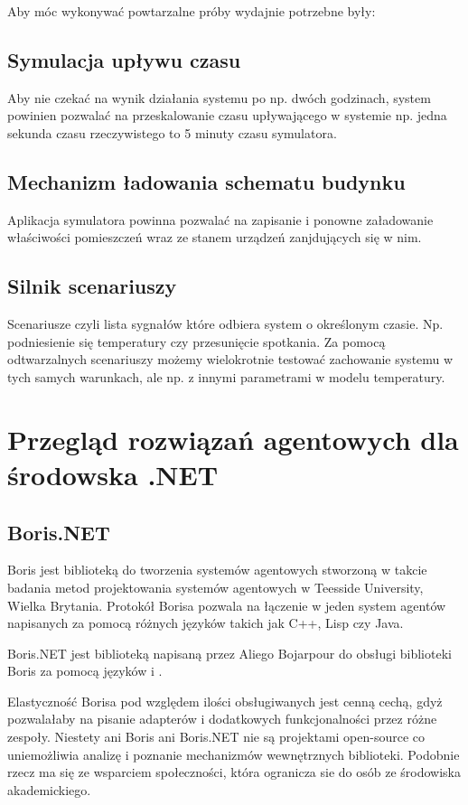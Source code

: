 Aby móc wykonywać powtarzalne próby wydajnie potrzebne były:

\subsection*{Symulacja upływu czasu}
Aby nie czekać na wynik działania systemu po np. dwóch godzinach, system powinien pozwalać na przeskalowanie czasu upływającego w systemie np. jedna sekunda czasu rzeczywistego to 5 minuty czasu symulatora.

\subsection*{Mechanizm ładowania schematu budynku}
Aplikacja symulatora powinna pozwalać na zapisanie i ponowne załadowanie właściwości pomieszczeń wraz ze stanem urządzeń zanjdujących się w nim.

\subsection*{Silnik scenariuszy}
Scenariusze czyli lista sygnałów które odbiera system o określonym czasie. Np. podniesienie się temperatury czy przesunięcie spotkania. Za pomocą odtwarzalnych scenariuszy możemy wielokrotnie testować zachowanie systemu w tych samych warunkach, ale np. z innymi parametrami w modelu temperatury.

\section{Przegląd rozwiązań agentowych dla środowska .NET}
\subsection{Boris.NET}
Boris jest biblioteką do tworzenia systemów agentowych stworzoną w takcie badania metod projektowania systemów agentowych w Teesside University, Wielka Brytania. Protokół Borisa pozwala na łączenie w jeden system agentów napisanych za pomocą różnych języków takich jak C++, Lisp czy Java. 

Boris.NET jest biblioteką napisaną przez Aliego Bojarpour do obsługi biblioteki Boris za pomocą języków \csh i \fsh. 

Elastyczność Borisa pod względem ilości obsługiwanych jest cenną cechą, gdyż pozwalałaby na pisanie adapterów i dodatkowych funkcjonalności przez różne zespoły. 
Niestety ani Boris ani Boris.NET nie są projektami open-source co uniemożliwia analizę i poznanie mechanizmów wewnętrznych biblioteki. Podobnie rzecz ma się ze wsparciem społeczności, która ogranicza sie do osób ze środowiska akademickiego.

